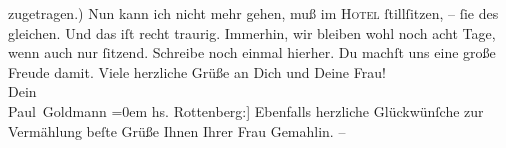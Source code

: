 \begin{ledgroupsized}[t]{13cm}
               zugetragen.) Nun kann ich nicht mehr {\pb}gehen, muß im
                  \textsc{Hotel}{ } ſtillſitzen, – ſie des gleichen. Und das iſt recht traurig.\pend
           \pstart
           Immerhin, wir bleiben wohl noch acht Tage, wenn auch nur ſitzend. Schreibe noch
               einmal hierher. Du machſt uns eine große Freude damit.\pend
           \pstart
           Viele herzliche Grüße an Dich und Deine Frau! {\\[\baselineskip]}Dein {\\[\baselineskip]}\spacefill\mbox{Paul Goldmann}\pend
           \leftskip=0em{}\pstart
           \noindent{}{[}hs. Rottenberg:{]} Ebenfalls herzliche Glückwünſche zur Vermählung {\kaufmannsund} beſte Grüße Ihnen {\kaufmannsund}
                  Ihrer Frau Gemahlin. –\pend
           
         
         \endnumbering{}\end{ledgroupsized}\begin{anhang}\end{anhang}\newcommand{\dateiname}{L03385}\newcommand{\titel}{Paul Goldmann und Theodore Rottenberg an Arthur Schnitzler, 29. 8. 1903}\newcommand{\editorInnen}{Martin Anton Müller und Laura Untner}
      